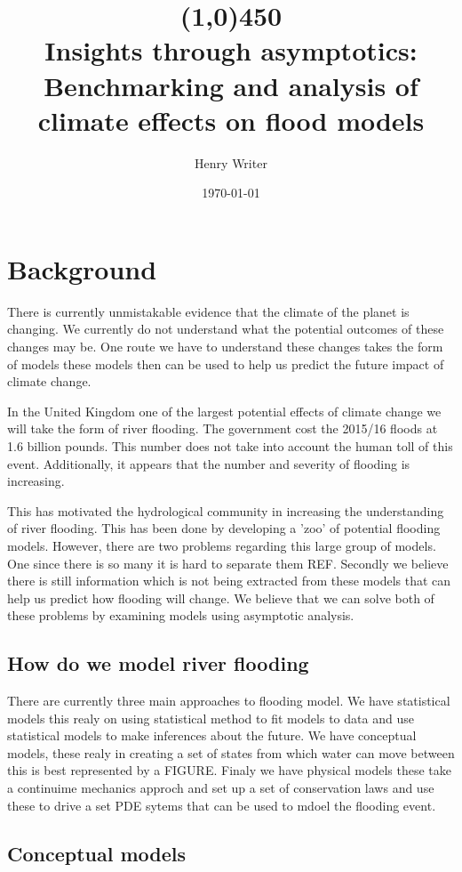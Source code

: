 \documentclass[11pt]{article}
\title{\line(1,0){450} \\ \Huge\textbf{Insights through asymptotics:}\\
 \LARGE Benchmarking and analysis of climate effects on flood models}
\author{Henry Writer }
\date{\today}
\begin{document}
\maketitle

\section{Background}

There is currently unmistakable evidence that the climate of the planet is changing. We currently do not understand what the potential outcomes of these changes may be. One route we have to understand these changes takes the form of models these models then can be used to help us predict the future impact of climate change.

In the United Kingdom one of the largest potential effects of climate change we will take the form of river flooding. The government cost the 2015/16 floods at 1.6 billion pounds. This number does not take into account the human toll of this event. Additionally, it appears that the number and severity of flooding is increasing. 


This has motivated the hydrological community in increasing the understanding of river flooding. This has been done by developing a 'zoo' of potential flooding models. However, there are two problems regarding this large group of models. One since there is so many it is hard to separate them REF. 
Secondly we believe there is still information which is not being extracted from these models that can help us predict how flooding will change. We believe that we can solve both of these problems by examining models using asymptotic analysis.

\subsection{How do we model river flooding}
There are currently three main approaches to flooding model. We have statistical models this realy on using statistical method to fit models to data and use statistical models to make inferences about the future. 
We have conceptual models, these realy in creating a set of states from which water can move between this is best represented by a FIGURE. 
Finaly we have physical models these take a continuime mechanics approch and set up a set of conservation laws and use these to drive a set PDE sytems that can be used to mdoel the flooding event.



\subsection{Conceptual models}
\end{document}
